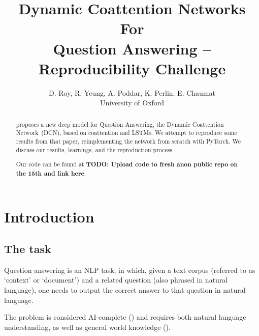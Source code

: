 \documentclass[a4paper, 10pt, conference]{article}
\title{\LARGE \bf
Dynamic Coattention Networks For \\Question Answering -- Reproducibility Challenge
}
\author{D. Roy, R. Yeung, A. Poddar, K. Perlin, E. Chaumat %
\\University of Oxford}%
\newcommand{\TODOx}[1]{{\color{red}\textbf{TODO: #1}}}
\begin{document}
\maketitle
\thispagestyle{empty}
\pagestyle{empty}



\begin{abstract}

\cite{dcn} proposes a new deep model for Question Answering, the Dynamic Coattention Network~(DCN), based on coattention and LSTMs. We attempt to reproduce some results from that paper, reimplementing the network from scratch with PyTorch. We discuss our results, learnings, and the reproduction process.



Our code can be found at \TODOx{Upload code to fresh anon public repo on the 15th and link here}.

\end{abstract}


\section{Introduction}

\subsection{The task}

Question answering is an NLP task, in which, given a text corpus (referred to as `context' or `document') and a related question (also phrased in natural language), one needs to output the correct answer to that question in natural language.

The problem is considered AI-complete (\cite{Weston2015TowardsAQ}) and requires both natural language understanding, as well as general world knowledge (\cite{rajpurkar2016squad}).
\end{document}
